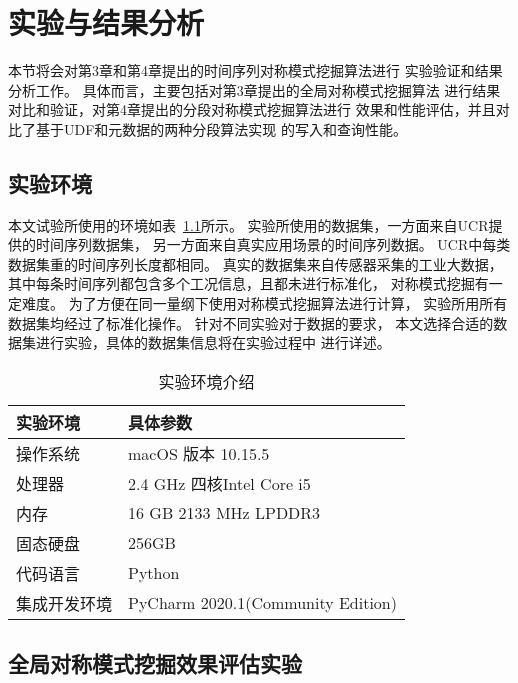 
\chapter{实验与结果分析}
本节将会对第3章和第4章提出的时间序列对称模式挖掘算法进行
实验验证和结果分析工作。
具体而言，主要包括对第3章提出的全局对称模式挖掘算法
进行结果对比和验证，对第4章提出的分段对称模式挖掘算法进行
效果和性能评估，并且对比了基于UDF和元数据的两种分段算法实现
的写入和查询性能。

\section{实验环境}
本文试验所使用的环境如表~\ref{tab:experiment_enviroment}所示。
实验所使用的数据集，一方面来自UCR提供的时间序列数据集，
另一方面来自真实应用场景的时间序列数据。
UCR中每类数据集重的时间序列长度都相同。
真实的数据集来自传感器采集的工业大数据，
其中每条时间序列都包含多个工况信息，且都未进行标准化，
对称模式挖掘有一定难度。
为了方便在同一量纲下使用对称模式挖掘算法进行计算，
实验所用所有数据集均经过了标准化操作。
针对不同实验对于数据的要求，
本文选择合适的数据集进行实验，具体的数据集信息将在实验过程中
进行详述。

\begin{table}
  \centering
  \caption{实验环境介绍}
  \begin{tabular}{ll}
    \toprule
    实验环境     & 具体参数                          \\
    \midrule
    操作系统     & macOS 版本 10.15.5                \\
    处理器       & 2.4 GHz 四核Intel Core i5         \\
    内存         & 16 GB 2133 MHz LPDDR3             \\
    固态硬盘     & 256GB                             \\
    代码语言     & Python                            \\
    集成开发环境 & PyCharm 2020.1(Community Edition) \\
    \bottomrule
  \end{tabular}
  \label{tab:experiment_enviroment}
\end{table}

\section{全局对称模式挖掘效果评估实验}

